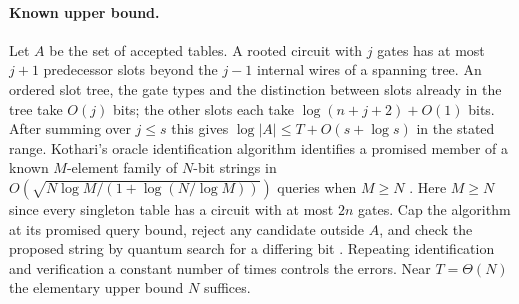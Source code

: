 \documentclass[11pt]{article}
\begin{document}
\paragraph{Known upper bound.} Let $A$ be the set of accepted tables. A rooted circuit with $j$ gates has at most $j+1$ predecessor slots beyond the $j-1$ internal wires of a spanning tree. An ordered slot tree, the gate types and the distinction between slots already in the tree take $O(j)$ bits; the other slots each take $\log(n+j+2)+O(1)$ bits. After summing over $j\le s$ this gives $\log|A|\le T+O(s+\log s)$ in the stated range. Kothari's oracle identification algorithm identifies a promised member of a known $M$-element family of $N$-bit strings in $O(\sqrt{N\log M/(1+\log(N/\log M))})$ queries when $M\ge N$ \cite{kothari}. Here $M\ge N$ since every singleton table has a circuit with at most $2n$ gates. Cap the algorithm at its promised query bound, reject any candidate outside $A$, and check the proposed string by quantum search for a differing bit \cite{grover}. Repeating identification and verification a constant number of times controls the errors. Near $T=\Theta(N)$ the elementary upper bound $N$ suffices.
\end{document}
